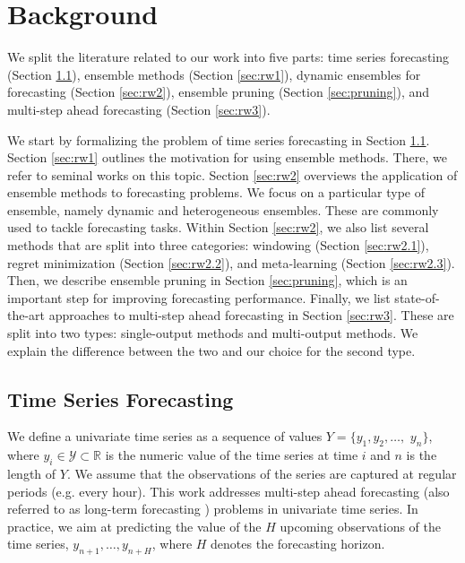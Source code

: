 \documentclass[smallcondensed]{svjour3}
\begin{document}
\section{Background}\label{sec:rw}

We split the literature related to our work into five parts: time series forecasting (Section \ref{sec:tsf}), ensemble methods (Section \ref{sec:rw1}), dynamic ensembles for forecasting (Section \ref{sec:rw2}), ensemble pruning (Section \ref{sec:pruning}), and multi-step ahead forecasting (Section \ref{sec:rw3}).

We start by formalizing the problem of time series forecasting in Section \ref{sec:tsf}.
Section \ref{sec:rw1} outlines the motivation for using ensemble methods. There, we refer to seminal works on this topic.
Section \ref{sec:rw2} overviews the application of ensemble methods to forecasting problems. We focus on a particular type of ensemble, namely dynamic and heterogeneous ensembles. These are commonly used to tackle forecasting tasks. Within Section \ref{sec:rw2}, we also list several methods that are split into three categories: windowing (Section \ref{sec:rw2.1}), regret minimization (Section \ref{sec:rw2.2}), and meta-learning (Section \ref{sec:rw2.3}). Then, we describe ensemble pruning in Section \ref{sec:pruning}, which is an important step for improving forecasting performance.
Finally, we list state-of-the-art approaches to multi-step ahead forecasting in Section \ref{sec:rw3}. These are split into two types: single-output methods and multi-output methods. We explain the difference between the two and our choice for the second type.

\subsection{Time Series Forecasting}\label{sec:tsf}

We define a univariate time series as a sequence of values $Y = \{y_1, y_2, \dots,$ $y_n \}$, where $y_i \in \mathcal{Y} \subset \mathbb{R}$ is the numeric value of the time series at time $i$ and $n$ is the length of $Y$. We assume that the observations of the series are captured at regular periods (e.g. every hour).
This work addresses multi-step ahead forecasting (also referred to as long-term forecasting \cite{taieb2012review}) problems in univariate time series.
In practice, we aim at predicting the value of the $H$ upcoming observations of the time series, $y_{n+1}, \ldots, y_{n+H}$, where $H$ denotes the forecasting horizon. 
\end{document}

